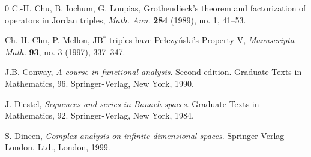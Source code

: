 \documentclass[10pt]{amsart}
\begin{document}
\begin{thebibliography}{0}
		 C.-H. Chu, B. Iochum, G. Loupias, Grothendieck's theorem and factorization of operators in Jordan triples, \emph{Math. Ann.} \textbf{284} (1989), no. 1, 41--53.
		
		
		
		
		  Ch.-H. Chu, P. Mellon, JB$^*$-triples have Pe\l{}czy{\'n}ski's Property V, \emph{Manuscripta Math.} \textbf{93}, no. 3 (1997), 337--347.
		
		
		 J.B. Conway, \emph{A course in functional analysis}. Second edition. Graduate Texts in Mathematics, 96. Springer-Verlag, New York, 1990. 	
		
		
		
		 J. Diestel, \emph{Sequences and series in Banach spaces}. Graduate Texts in Mathematics, 92. Springer-Verlag, New York, 1984.
		
		 S. Dineen, \emph{Complex analysis on infinite-dimensional spaces}. Springer-Verlag London, Ltd., London, 1999.
		
		
		
		
		

\end{thebibliography}
\end{document}
